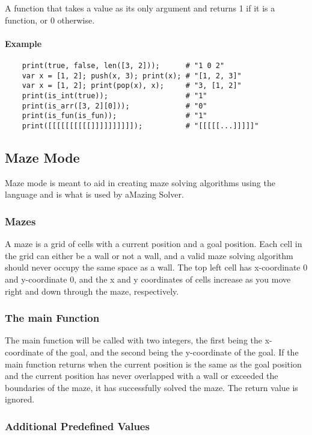 A function that takes a value as its only argument and returns 1 if it is a function, or 0 otherwise.

\paragraph{Example}

\begin{verbatim}
    print(true, false, len([3, 2]));      # "1 0 2"
    var x = [1, 2]; push(x, 3); print(x); # "[1, 2, 3]"
    var x = [1, 2]; print(pop(x), x);     # "3, [1, 2]"
    print(is_int(true));                  # "1"
    print(is_arr([3, 2][0]));             # "0"
    print(is_fun(is_fun));                # "1"
    print([[[[[[[[[[]]]]]]]]]]);          # "[[[[[...]]]]]"
\end{verbatim}

\subsection{Maze Mode}

Maze mode is meant to aid in creating maze solving algorithms using the language and is what is used by aMazing Solver.

\subsubsection{Mazes}

A maze is a grid of cells with a current position and a goal position. Each cell in the grid can either be a wall or not a wall, and a valid maze solving algorithm should never occupy the same space as a wall. The top left cell has x-coordinate 0 and y-coordinate 0, and the x and y coordinates of cells increase as you move right and down through the maze, respectively.

\subsubsection{The main Function}

The main function will be called with two integers, the first being the x-coordinate of the goal, and the second being the y-coordinate of the goal. If the main function returns when the current position is the same as the goal position and the current position has never overlapped with a wall or exceeded the boundaries of the maze, it has successfully solved the maze. The return value is ignored.

\subsubsection{Additional Predefined Values}

